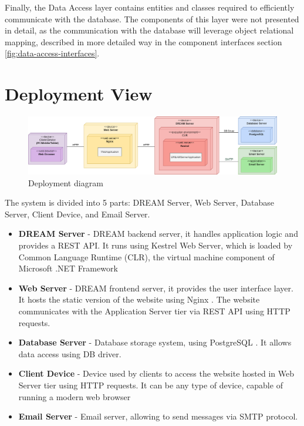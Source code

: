 Finally, the Data Access layer contains entities and classes required to efficiently communicate with the database. The components of this layer were not presented in detail, as the communication with the database will leverage object relational mapping, described in more detailed way in the component interfaces section \ref{fig:data-access-interfaces}.

\section{Deployment View}
\begin{figure}[H]
    \centering
    \includegraphics[width=\textwidth]{diagrams/deployment.png}
    \caption{Deployment diagram}
    \label{fig:deployment}
\end{figure}
The system is divided into 5 parts: DREAM Server, Web Server, Database Server, Client Device, and Email Server.
\begin{itemize}
    \item \textbf{DREAM Server} - DREAM backend server, it handles application logic and provides a REST API. It runs using Kestrel Web Server, which is loaded by Common Language Runtime (CLR), the virtual machine component of Microsoft .NET Framework 
    \item \textbf{Web Server} - DREAM frontend server, it provides the user interface layer. It hosts the static version of the website using Nginx \cite{nginx}. The website communicates with the Application Server tier via REST API using HTTP requests.
    \item \textbf{Database Server} - Database storage system, using PostgreSQL \cite{postgresql}. It allows data access using DB driver. 
    \item \textbf{Client Device} - Device used by clients to access the website hosted in Web Server tier using HTTP requests. It can be any type of device, capable of running a modern web browser
    \item \textbf{Email Server} - Email server, allowing to send messages via SMTP protocol.
\end{itemize}

